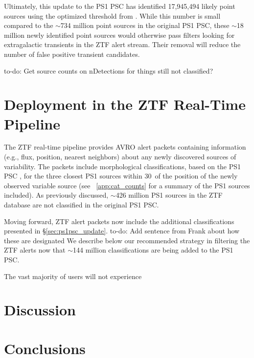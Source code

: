 \documentclass[twocolumn]{aastex63}
\newcommand{\todo}[1]{{\color{magenta} to-do: {#1}}}
\begin{document}
Ultimately, this update to the PS1 PSC has identified 17,945,494 likely point
sources using the optimized threshold from \citet[][RF score $\ge
0.83$]{Tachibana18}. While this number is small compared to the $\sim$734
million point sources in the original PS1 PSC, these $\sim$18 million newly
identified point sources would otherwise pass filters looking for
extragalactic transients in the ZTF alert stream. Their removal will reduce
the number of false positive transient candidates.

\todo{Get source counts on nDetections for things still not classified?}

\section{Deployment in the ZTF Real-Time Pipeline}\label{sec:discussion}

The ZTF real-time pipeline \citep{Masci19} provides AVRO alert packets
\citep[see][]{Patterson19} containing information (e.g., flux, position,
nearest neighbors) about any newly discovered sources of variability. The
packets include morphological classifications, based on the PS1 PSC
\citep{Tachibana18}, for the three closest PS1 sources within 30\arcsec\ of
the position of the newly observed variable source (see ~\ref{app:cat_counts}
for a summary of the PS1 sources included). As previously discussed, $\sim$426
million PS1 sources in the ZTF database are not classified in the original PS1
PSC.

Moving forward, ZTF alert packets now include the additional classifications
presented in \S\ref{sec:ps1psc_update}. \todo{Add sentence from Frank about
how these are designated} We describe below our recommended strategy in
filtering the ZTF alerts now that $\sim$144 million classifications are being
added to the PS1 PSC.

The vast majority of users will not experience 



\section{Discussion}

\section{Conclusions}

\acknowledgments

\vspace{5mm}
\facilities{}
\end{document}
